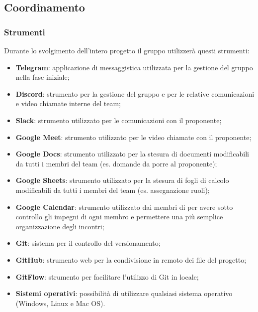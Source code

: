 \subsection{Coordinamento}











\subsubsection{Strumenti}
Durante lo svolgimento dell'intero progetto il gruppo utilizzerà questi strumenti:
\begin{itemize}
	\item \textbf{Telegram}: applicazione di messaggistica utilizzata per la gestione del gruppo nella fase iniziale;
	\item \textbf{Discord}: strumento per la gestione del gruppo e per le relative comunicazioni e video chiamate interne del team;
	\item \textbf{Slack}: strumento utilizzato per le comunicazioni con il proponente;
	\item \textbf{Google Meet}: strumento utilizzato per le video chiamate con il proponente;
	\item \textbf{Google Docs}: strumento utilizzato per la stesura di documenti modificabili da tutti i membri del team (es. domande da porre al proponente);
	\item \textbf{Google Sheets}: strumento utilizzato per la stesura di fogli di calcolo modificabili da tutti i membri del team (es. assegnazione ruoli);
	\item \textbf{Google Calendar}: strumento utilizzato dai membri di \Omicron{} per avere sotto controllo gli impegni di ogni membro e permettere una più semplice organizzazione degli incontri;
	\item \textbf{Git}: sistema per il controllo del versionamento;
	\item \textbf{GitHub}: strumento web per la condivisione in remoto dei file del progetto;
	\item \textbf{GitFlow}: strumento per facilitare l'utilizzo di Git in locale;
	\item \textbf{Sistemi operativi}: possibilità di utilizzare qualsiasi sistema operativo (Windows, Linux e Mac OS).
\end{itemize}